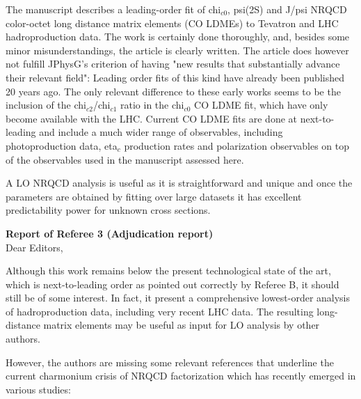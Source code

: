 \documentclass[aps,prc,preprint,superscriptaddress,showpacs,showkeys,amsmath]{revtex4-1}
\begin{document}
The manuscript describes a leading-order fit of chi$_{c0}$, psi(2S) and J/psi NRQCD color-octet long distance matrix elements (CO LDMEs) to 
Tevatron and LHC hadroproduction data. The work is certainly done thoroughly, and, besides some minor misunderstandings, the article is 
clearly written. The article does however not fulfill JPhysG's criterion of having "new results that substantially advance their 
relevant field": Leading order fits of this kind have already been published 20 years ago. The only relevant difference to these 
early works seems to be the inclusion of the chi$_{c2}$/chi$_{c1}$ ratio in the chi$_{c0}$ CO LDME fit, which have only become available with 
the LHC. Current CO LDME fits are done at next-to-leading and include a much wider range of observables, including photoproduction data, 
eta$_c$ production rates and polarization observables on top of the observables used in the manuscript assessed here.

{\color{blue}

  A LO NRQCD analysis is useful as it is straightforward and unique and once
  the parameters are obtained by fitting over large datasets it has excellent 
  predictability power for unknown cross sections.

}



{\bf Report of Referee 3 (Adjudication report)} \\

Dear Editors,

Although this work remains below the present technological state of the art, which is next-to-leading order as pointed out 
correctly by Referee B, it should still be of some interest. In fact, it present a comprehensive lowest-order analysis of 
hadroproduction data, including very recent LHC data. The resulting long-distance matrix elements may be useful as input 
for LO analysis by other authors.

However, the authors are missing some relevant references that underline the current charmonium crisis of NRQCD 
factorization which has recently emerged in various studies:
\end{document}
